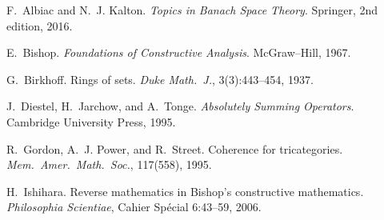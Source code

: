 \documentclass[11pt]{article}
\theoremstyle{definition}
\theoremstyle{remark}
\begin{document}

\begin{thebibliography}{10}

F.~Albiac and N.~J. Kalton.
\newblock \emph{Topics in Banach Space Theory}.
\newblock Springer, 2nd edition, 2016.

E.~Bishop.
\newblock \emph{Foundations of Constructive Analysis}.
\newblock McGraw--Hill, 1967.

G.~Birkhoff.
\newblock Rings of sets.
\newblock \emph{Duke Math.\ J.}, 3(3):443--454, 1937.

J.~Diestel, H.~Jarchow, and A.~Tonge.
\newblock \emph{Absolutely Summing Operators}.
\newblock Cambridge University Press, 1995.

R.~Gordon, A.~J. Power, and R.~Street.
\newblock Coherence for tricategories.
\newblock \emph{Mem.\ Amer.\ Math.\ Soc.}, 117(558), 1995.

H.~Ishihara.
\newblock Reverse mathematics in Bishop's constructive mathematics.
\newblock \emph{Philosophia Scientiae}, Cahier Spécial 6:43--59, 2006.

\end{thebibliography}
\end{document}
